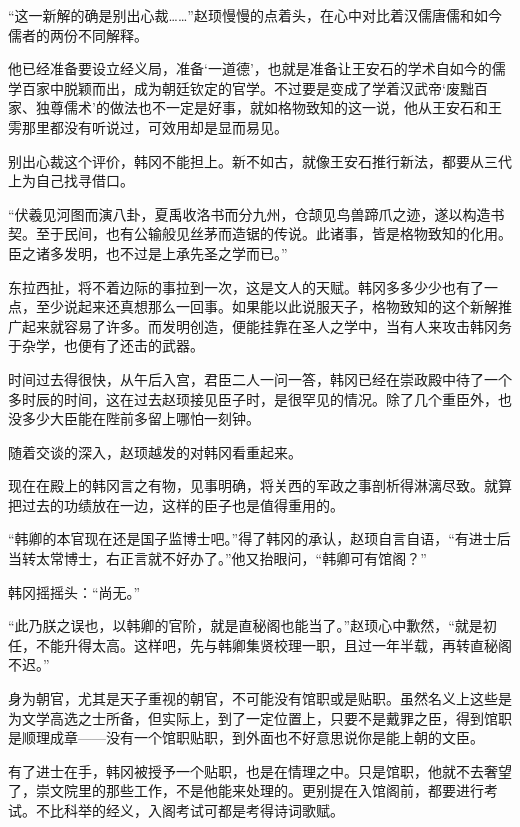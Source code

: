 “这一新解的确是别出心裁……”赵顼慢慢的点着头，在心中对比着汉儒唐儒和如今儒者的两份不同解释。

他已经准备要设立经义局，准备‘一道德’，也就是准备让王安石的学术自如今的儒学百家中脱颖而出，成为朝廷钦定的官学。不过要是变成了学着汉武帝‘废黜百家、独尊儒术’的做法也不一定是好事，就如格物致知的这一说，他从王安石和王雱那里都没有听说过，可效用却是显而易见。

别出心裁这个评价，韩冈不能担上。新不如古，就像王安石推行新法，都要从三代上为自己找寻借口。

“伏羲见河图而演八卦，夏禹收洛书而分九州，仓颉见鸟兽蹄爪之迹，遂以构造书契。至于民间，也有公输般见丝茅而造锯的传说。此诸事，皆是格物致知的化用。臣之诸多发明，也不过是上承先圣之学而已。”

东拉西扯，将不着边际的事拉到一次，这是文人的天赋。韩冈多多少少也有了一点，至少说起来还真想那么一回事。如果能以此说服天子，格物致知的这个新解推广起来就容易了许多。而发明创造，便能挂靠在圣人之学中，当有人来攻击韩冈务于杂学，也便有了还击的武器。

时间过去得很快，从午后入宫，君臣二人一问一答，韩冈已经在崇政殿中待了一个多时辰的时间，这在过去赵顼接见臣子时，是很罕见的情况。除了几个重臣外，也没多少大臣能在陛前多留上哪怕一刻钟。

随着交谈的深入，赵顼越发的对韩冈看重起来。

现在在殿上的韩冈言之有物，见事明确，将关西的军政之事剖析得淋漓尽致。就算把过去的功绩放在一边，这样的臣子也是值得重用的。

“韩卿的本官现在还是国子监博士吧。”得了韩冈的承认，赵顼自言自语，“有进士后当转太常博士，右正言就不好办了。”他又抬眼问，“韩卿可有馆阁？”

韩冈摇摇头：“尚无。”

“此乃朕之误也，以韩卿的官阶，就是直秘阁也能当了。”赵顼心中歉然，“就是初任，不能升得太高。这样吧，先与韩卿集贤校理一职，且过一年半载，再转直秘阁不迟。”

身为朝官，尤其是天子重视的朝官，不可能没有馆职或是贴职。虽然名义上这些是为文学高选之士所备，但实际上，到了一定位置上，只要不是戴罪之臣，得到馆职是顺理成章——没有一个馆职贴职，到外面也不好意思说你是能上朝的文臣。

有了进士在手，韩冈被授予一个贴职，也是在情理之中。只是馆职，他就不去奢望了，崇文院里的那些工作，不是他能来处理的。更别提在入馆阁前，都要进行考试。不比科举的经义，入阁考试可都是考得诗词歌赋。

